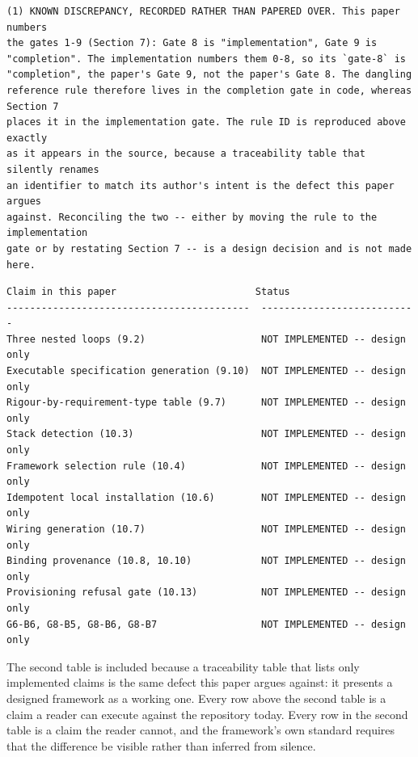 \documentclass[11pt,a4paper]{article}
\begin{document}
\begin{Verbatim}[fontsize=\footnotesize,breaklines=true,breakanywhere=true,breakautoindent=false,samepage=false]
(1) KNOWN DISCREPANCY, RECORDED RATHER THAN PAPERED OVER. This paper numbers
the gates 1-9 (Section 7): Gate 8 is "implementation", Gate 9 is
"completion". The implementation numbers them 0-8, so its `gate-8` is
"completion", the paper's Gate 9, not the paper's Gate 8. The dangling
reference rule therefore lives in the completion gate in code, whereas Section 7
places it in the implementation gate. The rule ID is reproduced above exactly
as it appears in the source, because a traceability table that silently renames
an identifier to match its author's intent is the defect this paper argues
against. Reconciling the two -- either by moving the rule to the implementation
gate or by restating Section 7 -- is a design decision and is not made here.
\end{Verbatim}

\begin{Verbatim}[fontsize=\footnotesize,breaklines=true,breakanywhere=true,breakautoindent=false,samepage=false]
Claim in this paper                        Status
------------------------------------------  ---------------------------
Three nested loops (9.2)                    NOT IMPLEMENTED -- design only
Executable specification generation (9.10)  NOT IMPLEMENTED -- design only
Rigour-by-requirement-type table (9.7)      NOT IMPLEMENTED -- design only
Stack detection (10.3)                      NOT IMPLEMENTED -- design only
Framework selection rule (10.4)             NOT IMPLEMENTED -- design only
Idempotent local installation (10.6)        NOT IMPLEMENTED -- design only
Wiring generation (10.7)                    NOT IMPLEMENTED -- design only
Binding provenance (10.8, 10.10)            NOT IMPLEMENTED -- design only
Provisioning refusal gate (10.13)           NOT IMPLEMENTED -- design only
G6-B6, G8-B5, G8-B6, G8-B7                  NOT IMPLEMENTED -- design only
\end{Verbatim}

The second table is included because a traceability table that lists only implemented claims is the same defect this paper argues against: it presents a designed framework as a working one. Every row above the second table is a claim a reader can execute against the repository today. Every row in the second table is a claim the reader cannot, and the framework's own standard requires that the difference be visible rather than inferred from silence.
\end{document}
